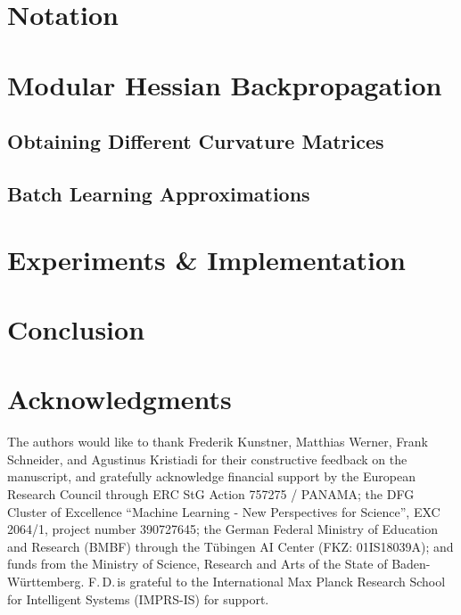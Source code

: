 \section{Notation}\label{hbp::sec:basicSetting}


\section{Modular Hessian Backpropagation}\label{hbp::sec:modularApproach}


\subsection{Obtaining Different Curvature Matrices}\label{hbp::subsec:curvatureMatrices}


\subsection{Batch Learning Approximations}\label{hbp::subsec:batchLearning}


\section{Experiments \& Implementation}\label{hbp::sec:experiments}


\section{Conclusion}


\section*{Acknowledgments}
The authors would like to thank Frederik Kunstner, Matthias Werner, Frank
Schneider, and Agustinus Kristiadi for their constructive feedback on the
manuscript, and gratefully acknowledge financial support by the European
Research Council through ERC StG Action 757275 / PANAMA; the DFG Cluster of
Excellence “Machine Learning - New Perspectives for Science”, EXC 2064/1,
project number 390727645; the German Federal Ministry of Education and Research
(BMBF) through the T\"ubingen AI Center (FKZ: 01IS18039A); and funds from the
Ministry of Science, Research and Arts of the State of Baden-W\"urttemberg.
F.\,D.\,is grateful to the International Max Planck Research School for
Intelligent Systems (IMPRS-IS) for support.

